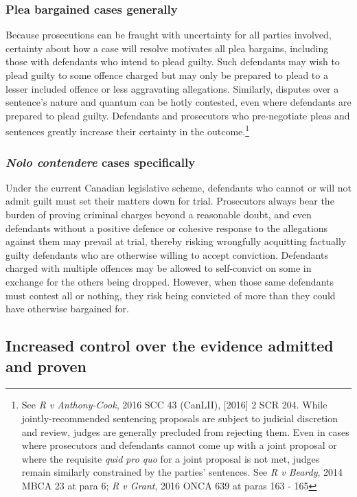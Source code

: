 \subsubsection{Plea bargained cases generally}

Because prosecutions can be fraught with uncertainty for all parties involved, certainty about how a case will resolve motivates all plea bargains, including those with defendants who intend to plead guilty. Such defendants may wish to plead guilty to some offence charged but may only be prepared to plead to a lesser included offence or less aggravating allegations. Similarly, disputes over a sentence's nature and quantum can be hotly contested, even where defendants are prepared to plead guilty. Defendants and prosecutors who pre-negotiate pleas and sentences greatly increase their certainty in the outcome.\footnote{See \textit{R v Anthony-Cook}, 2016 SCC 43 (CanLII), [2016] 2 SCR 204. While jointly-recommended sentencing proposals are subject to judicial discretion and review, judges are generally precluded from rejecting them. Even in cases where prosecutors and defendants cannot come up with a joint proposal or where the requisite \textit{quid pro quo} for a joint proposal is not met, judges remain similarly constrained by the parties' sentences. See \textit{R v Beardy}, 2014 MBCA 23 at para 6; \textit{R v Grant}, 2016 ONCA 639 at paras 163 - 165}

\subsubsection{\textit{Nolo contendere} cases specifically}

Under the current Canadian legislative scheme, defendants who cannot or will not admit guilt must set their matters down for trial. Prosecutors always bear the burden of proving criminal charges beyond a reasonable doubt, and even defendants without a positive defence or cohesive response to the allegations against them may prevail at trial, thereby risking wrongfully acquitting factually guilty defendants who are otherwise willing to accept conviction. Defendants charged with multiple offences may be allowed to self-convict on some in exchange for the others being dropped. However, when those same defendants must contest all or nothing, they risk being convicted of more than they could have otherwise bargained for.

\subsection{Increased control over the evidence admitted and proven}

